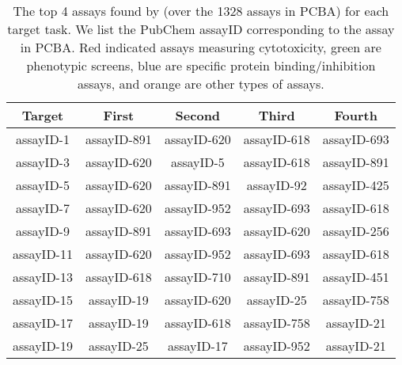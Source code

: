 \begin{table*}[h!]
    \centering
    \begin{tabular}{c | c c c c } 
     \toprule
     Target & First & Second & Third & Fourth \\
     \midrule
     \cellcolor[HTML]{FFCCC9}assayID-1  & \cellcolor[HTML]{CBCEFB}assayID-891 & \cellcolor[HTML]{FFCCC9}assayID-620 & \cellcolor[HTML]{9AFF99}assayID-618 & \cellcolor[HTML]{CBCEFB}assayID-693 \\
\rowcolor[HTML]{FFCCC9} 
assayID-3                          & assayID-620                         & assayID-5                           & \cellcolor[HTML]{9AFF99}assayID-618 & \cellcolor[HTML]{CBCEFB}assayID-891 \\
\rowcolor[HTML]{FFCCC9} 
assayID-5                          & assayID-620                         & \cellcolor[HTML]{CBCEFB}assayID-891 & assayID-92                          & \cellcolor[HTML]{CBCEFB}assayID-425 \\
\cellcolor[HTML]{FFCCC9}assayID-7  & \cellcolor[HTML]{FFCCC9}assayID-620 & \cellcolor[HTML]{CBCEFB}assayID-952 & \cellcolor[HTML]{CBCEFB}assayID-693 & \cellcolor[HTML]{9AFF99}assayID-618 \\
\rowcolor[HTML]{FFCCC9} 
assayID-9                          & \cellcolor[HTML]{CBCEFB}assayID-891 & \cellcolor[HTML]{CBCEFB}assayID-693 & assayID-620                         & assayID-256                         \\
\cellcolor[HTML]{FFCCC9}assayID-11 & \cellcolor[HTML]{FFCCC9}assayID-620 & \cellcolor[HTML]{CBCEFB}assayID-952 & \cellcolor[HTML]{CBCEFB}assayID-693 & \cellcolor[HTML]{9AFF99}assayID-618 \\
\cellcolor[HTML]{FFCCC9}assayID-13 & \cellcolor[HTML]{9AFF99}assayID-618 & \cellcolor[HTML]{FFCE93}assayID-710 & \cellcolor[HTML]{CBCEFB}assayID-891 & \cellcolor[HTML]{CBCEFB}assayID-451 \\
\rowcolor[HTML]{FFCCC9} 
assayID-15                         & assayID-19                          & assayID-620                         & assayID-25                          & \cellcolor[HTML]{CBCEFB}assayID-758 \\
\rowcolor[HTML]{FFCCC9} 
assayID-17                         & assayID-19                          & \cellcolor[HTML]{9AFF99}assayID-618 & \cellcolor[HTML]{CBCEFB}assayID-758 & assayID-21                          \\
\rowcolor[HTML]{FFCCC9} 
assayID-19                         & assayID-25                          & assayID-17                          & \cellcolor[HTML]{CBCEFB}assayID-952 & assayID-21                          \\
     \bottomrule
    \end{tabular}
    \caption{The top 4 assays found by \method (over the 1328 assays in PCBA) for each target task. We list the PubChem assayID corresponding to the assay in PCBA. Red indicated assays measuring cytotoxicity, green are phenotypic screens, blue are specific protein binding/inhibition assays, and orange are other types of assays. }
    \label{tab:chem_assay_sel}
\end{table*}

